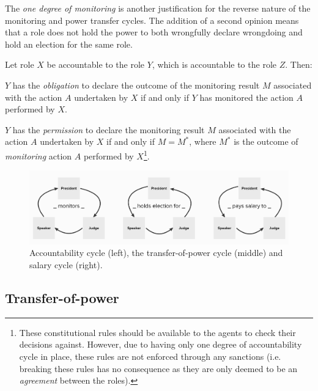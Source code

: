 The \emph{one degree of monitoring} is another justification for the reverse nature of the monitoring and power transfer cycles. The addition of a second opinion means that a role does not hold the power to both wrongfully declare wrongdoing and hold an election for the same role.

Let role $X$ be accountable to the role $Y$, which is accountable to the role $Z$. Then:
\begin{rule_IIGO} \label{rule:monitoring_1}
    $Y$ has the \emph{obligation} to declare the outcome of the monitoring result $M$ associated with the action $A$ undertaken by $X$ if and only if $Y$ has monitored the action $A$ performed by $X$.
\end{rule_IIGO}
\begin{rule_IIGO} \label{rule:monitoring_2}
    $Y$ has the \emph{permission} to declare the monitoring result $M$ associated with the action $A$ undertaken by $X$ if and only if $M = M^{*}$, where $M^{*}$ is the outcome of \emph{monitoring} action $A$ performed by $X$\footnote{These constitutional rules should be available to the agents to check their decisions against. However, due to having only one degree of accountability cycle in place, these rules are not enforced through any sanctions (i.e. breaking these rules has no consequence as they are only deemed to be an \emph{agreement} between the roles).}.
\end{rule_IIGO}


\begin{figure}[!htb]
\centering
\includegraphics[scale=0.33]{05_iigo/images/role cycles.png}
\caption{Accountability cycle (left), the transfer-of-power cycle (middle) and salary cycle (right).}
\label{fig:cycles_in_IIGO}
\end{figure}


\subsection{Transfer-of-power}
\label{subsec:transfer-of-power}

